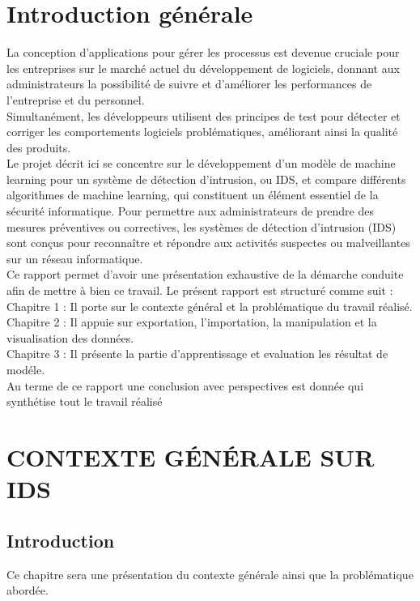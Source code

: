 \documentclass[a4paper,12pt]{report}
\begin{document}
\chapter*{\centering Introduction générale}
\noindent\normalsize{}La conception d'applications pour gérer les processus est devenue cruciale pour les entreprises sur le marché actuel du développement de logiciels, donnant aux administrateurs la possibilité de suivre et d'améliorer les performances de l'entreprise et du personnel. \\[0.5cm]
\normalsize Simultanément, les développeurs utilisent des principes de test pour détecter et corriger les comportements logiciels problématiques, améliorant ainsi la qualité des produits.\\[0.5cm]
\normalsize Le projet décrit ici se concentre sur le développement d'un modèle de machine learning pour un système de détection d'intrusion, ou IDS, et compare différents algorithmes de machine learning, qui constituent un élément essentiel de la sécurité informatique. Pour permettre aux administrateurs de prendre des mesures préventives ou correctives, les systèmes de détection d'intrusion (IDS) sont conçus pour reconnaître et répondre aux activités suspectes ou malveillantes sur un réseau informatique.\\[0.5cm]
\normalsize Ce rapport permet d’avoir une présentation exhaustive de la démarche conduite afin de mettre à bien ce travail.
Le présent rapport est structuré comme suit :\\
\textcolor{colortxt}{Chapitre 1 :} Il porte sur le contexte général et la problématique du travail réalisé.\\
\textcolor{colortxt}{Chapitre 2 :} Il appuie sur exportation, l'importation, la manipulation et la visualisation des données.\\
\textcolor{colortxt}{Chapitre 3 :} Il présente la partie d'apprentissage et evaluation les résultat de modéle.\\[0.5cm]
Au terme de ce rapport une conclusion avec perspectives est donnée qui synthétise tout le travail réalisé



\renewcommand{\chaptername}{Chapter}
\chapter{CONTEXTE GÉNÉRALE SUR IDS}

\newpage
\pagestyle{plain} 
\section{Introduction}
\noindent \normalsize Ce chapitre sera une présentation du contexte générale  ainsi que la problématique abordée.
\end{document}
